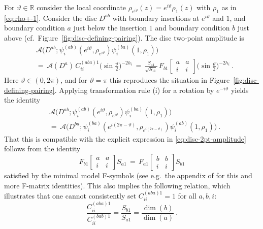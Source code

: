 \documentclass[11pt,a4paper]{article}
\numberwithin{equation}{section}
\begin{document}
For $\vartheta \in \mathbb{R}$ consider the local coordinate $\rho_{e^{i\vartheta}}(z) = e^{i \vartheta} \rho_1(z)$ with $\rho_1$ as in \eqref{eq:rho+-1}. 
Consider the disc $D^{ab}$ with boundary insertions at $e^{i\vartheta}$ and $1$, and boundary condition $a$ just below the insertion $1$ and boundary condition $b$ just above (cf.\ Figure~\ref{fig:disc-defining-pairing}). 
The disc two-point amplitude is
%
\begin{align}\label{eq:disc-2pt-amplitude}
    &\mathcal{A}\big(D^{ab};\psi_i^{(ab)}(e^{i\vartheta},\rho_{e^{i\vartheta}})\psi_i^{(ba)}(1,\rho_1)\big)
\nonumber\\
    &= \,
    \mathcal{A}(D^a)\,
    C^{(aba)1}_{ii} \big( \sin \tfrac{\vartheta}2 \big)^{-2 h_i} 
    \,=\,
    \frac{S_{a1}}{\sqrt{S_{11}}}\,
    F_{b1}\!\begin{bmatrix}a & a \\i & i\end{bmatrix}
    \big( \sin \tfrac{\vartheta}2 \big)^{-2 h_i} \ .
\end{align}
%
Here $\vartheta \in (0,2\pi)$, and 
for $\vartheta = \pi$ this reproduces the situation in Figure~\ref{fig:disc-defining-pairing}. Applying transformation rule (i) for a rotation by $e^{-i\vartheta}$ yields the identity
\begin{align}
    &\mathcal{A}\big(D^{ab};\psi_i^{(ab)}(e^{i\vartheta},\rho_{e^{i\vartheta}})\psi_i^{(ba)}(1,\rho_1)\big)
    \nonumber \\
    &=\,
    \mathcal{A}\big(D^{ba};\psi_i^{(ba)}(e^{i(2\pi -\vartheta)},\rho_{e^{i(2\pi -\vartheta)}})\psi_i^{(ab)}(1,\rho_1)\big) \ .
\end{align}
That this is compatible with the explicit expression in \eqref{eq:disc-2pt-amplitude} follows from the identity
\begin{equation}\label{eq:F-matrix-S-identity}
     F_{b1}\!\begin{bmatrix}a & a \\i & i\end{bmatrix} S_{a1} \,=\,  F_{a1}\!\begin{bmatrix}b & b \\i & i\end{bmatrix} S_{b1}
\end{equation}
satisfied by the minimal model F-symbols (see e.g.\ the appendix of \cite{Runkel:1998he} for this and more F-matrix identities). This also implies the following relation, which illustrates that one cannot consistently set $C^{(aba)1}_{ii} = 1$ for all $a,b,i$:
\begin{equation}\label{eq:2-point-sc-ratio}
    \frac{C^{(aba)1}_{ii}}{C^{(bab)1}_{ii}} 
    = \frac{S_{b1}}{S_{a1}} 
    = \frac{\dim(b)}{\dim(a)} \ . 
\end{equation}
\end{document}
